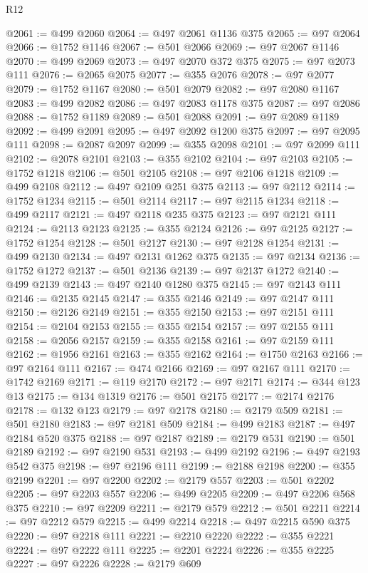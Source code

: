 \begin{lexlean}{R12}
\begin{coremodule}
{{{{{{{{{{{{{{{{{{{{{{{{{{{{{{{{{{{{{{{{{{{{{{{{{{{{{{{{{{{{{{{{{{{{{{{{{{{{{{{{{{@2061 := @499 @2060
@2064 := @497 @2061 @1136 @375
@2065 := @97 @2064
@2066 := @1752 @1146
@2067 := @501 @2066
@2069 := @97 @2067 @1146
@2070 := @499 @2069
@2073 := @497 @2070 @372 @375
@2075 := @97 @2073 @111
@2076 := @2065 @2075
@2077 := @355 @2076
@2078 := @97 @2077
@2079 := @1752 @1167
@2080 := @501 @2079
@2082 := @97 @2080 @1167
@2083 := @499 @2082
@2086 := @497 @2083 @1178 @375
@2087 := @97 @2086
@2088 := @1752 @1189
@2089 := @501 @2088
@2091 := @97 @2089 @1189
@2092 := @499 @2091
@2095 := @497 @2092 @1200 @375
@2097 := @97 @2095 @111
@2098 := @2087 @2097
@2099 := @355 @2098
@2101 := @97 @2099 @111
@2102 := @2078 @2101
@2103 := @355 @2102
@2104 := @97 @2103
@2105 := @1752 @1218
@2106 := @501 @2105
@2108 := @97 @2106 @1218
@2109 := @499 @2108
@2112 := @497 @2109 @251 @375
@2113 := @97 @2112
@2114 := @1752 @1234
@2115 := @501 @2114
@2117 := @97 @2115 @1234
@2118 := @499 @2117
@2121 := @497 @2118 @235 @375
@2123 := @97 @2121 @111
@2124 := @2113 @2123
@2125 := @355 @2124
@2126 := @97 @2125
@2127 := @1752 @1254
@2128 := @501 @2127
@2130 := @97 @2128 @1254
@2131 := @499 @2130
@2134 := @497 @2131 @1262 @375
@2135 := @97 @2134
@2136 := @1752 @1272
@2137 := @501 @2136
@2139 := @97 @2137 @1272
@2140 := @499 @2139
@2143 := @497 @2140 @1280 @375
@2145 := @97 @2143 @111
@2146 := @2135 @2145
@2147 := @355 @2146
@2149 := @97 @2147 @111
@2150 := @2126 @2149
@2151 := @355 @2150
@2153 := @97 @2151 @111
@2154 := @2104 @2153
@2155 := @355 @2154
@2157 := @97 @2155 @111
@2158 := @2056 @2157
@2159 := @355 @2158
@2161 := @97 @2159 @111
@2162 := @1956 @2161
@2163 := @355 @2162
@2164 := @1750 @2163
@2166 := @97 @2164 @111
@2167 := @474 @2166
@2169 := @97 @2167 @111
@2170 := @1742 @2169
@2171 := @119 @2170
@2172 := @97 @2171
@2174 := @344 @123 @13
@2175 := @134 @1319
@2176 := @501 @2175
@2177 := @2174 @2176
@2178 := @132 @123
@2179 := @97 @2178
@2180 := @2179 @509
@2181 := @501 @2180
@2183 := @97 @2181 @509
@2184 := @499 @2183
@2187 := @497 @2184 @520 @375
@2188 := @97 @2187
@2189 := @2179 @531
@2190 := @501 @2189
@2192 := @97 @2190 @531
@2193 := @499 @2192
@2196 := @497 @2193 @542 @375
@2198 := @97 @2196 @111
@2199 := @2188 @2198
@2200 := @355 @2199
@2201 := @97 @2200
@2202 := @2179 @557
@2203 := @501 @2202
@2205 := @97 @2203 @557
@2206 := @499 @2205
@2209 := @497 @2206 @568 @375
@2210 := @97 @2209
@2211 := @2179 @579
@2212 := @501 @2211
@2214 := @97 @2212 @579
@2215 := @499 @2214
@2218 := @497 @2215 @590 @375
@2220 := @97 @2218 @111
@2221 := @2210 @2220
@2222 := @355 @2221
@2224 := @97 @2222 @111
@2225 := @2201 @2224
@2226 := @355 @2225
@2227 := @97 @2226
@2228 := @2179 @609
}}}}}}}}}}}}}}}}}}}}}}}}}}}}}}}}}}}}}}}}}}}}}}}}}}}}}}}}}}}}}}}}}}}}}}}}}}}}}}}}}}
\end{coremodule}
\end{lexlean}
